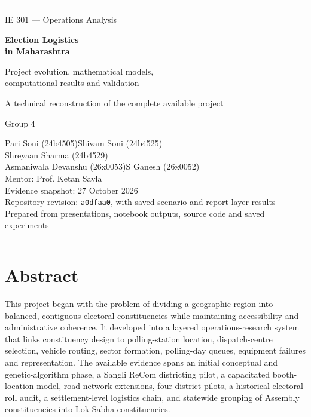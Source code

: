 \documentclass[11pt,a4paper,oneside]{report}
\begin{document}
\begin{titlepage}
\color{navy}\rule{\textwidth}{2pt}
\vspace*{14mm}
{\Large IE 301 --- Operations Analysis\par}
\vspace{10mm}
{\Huge\bfseries Election Logistics\\[4pt]in Maharashtra\par}
\vspace{7mm}
{\LARGE Project evolution, mathematical models,\\computational results and validation\par}
\vspace{10mm}
{\large A technical reconstruction of the complete available project\par}
\vfill
{\large Group 4\par}
Pari Soni (24b4505)\quad Shivam Soni (24b4525)\\
Shreyaan Sharma (24b4529)\\
Asmaniwala Devanshu (26x0053)\quad S Ganesh (26x0052)\\[8pt]
Mentor: Prof. Ketan Savla\\[12pt]
Evidence snapshot: 27 October 2026\\
Repository revision: \texttt{a0dfaa0}, with saved scenario and report-layer results\\
Prepared from presentations, notebook outputs, source code and saved experiments
\vspace{7mm}\rule{\textwidth}{.6pt}
\end{titlepage}
\chapter*{Abstract}
This project began with the problem of dividing a geographic region into balanced, contiguous electoral constituencies while maintaining accessibility and administrative coherence. It developed into a layered operations-research system that links constituency design to polling-station location, dispatch-centre selection, vehicle routing, sector formation, polling-day queues, equipment failures and representation. The available evidence spans an initial conceptual and genetic-algorithm phase, a Sangli ReCom districting pilot, a capacitated booth-location model, road-network extensions, four district pilots, a historical electoral-roll audit, a settlement-level logistics chain, and statewide grouping of Assembly constituencies into Lok Sabha constituencies.
\end{document}
